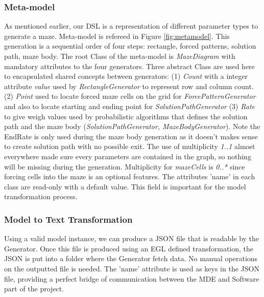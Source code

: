 \documentclass[review]{elsarticle}
\begin{document}
\subsubsection{Meta-model}
As mentioned earlier, our DSL is a representation of different parameter types to generate a maze. Meta-model is refereed in Figure \ref{fig:metamodel}. This generation is a sequential order of four steps: rectangle, forced patterns, solution path, maze body. The root Class of the meta-model is \textit{MazeDiagram} with mandatory attributes to the four generators. Three abstract Class are used here to encapsulated shared concepts between generators: (1) \textit{Count} with a integer attribute \textit{value} used by \textit{RectangleGenerator} to represent row and column count. (2) \textit{Point} used to locate forced maze cells on the grid for \textit{ForcePatternGenerator} and also to locate starting and ending point for \textit{SolutionPathGenerator} (3) \textit{Rate} to give weigh values used by probabilistic algorithms that defines the solution path and the maze body (\textit{SolutionPathGenerator, MazeBodyGenerator}). Note the EndRate is only used during the maze body generation as it doesn't makes sense to create solution path with no possible exit. The use of multiplicity \textit{1..1} almost everywhere made sure every parameters are contained in the graph, so nothing will be missing during the generation. Multiplicity for \textit{mazeCells} is \textit{0..*} since forcing cells into the maze is an optional features. The attributes 'name' in each class are read-only with a default value. This field is important for the model transformation process.

\subsubsection{Model to Text Transformation }
Using a valid model instance, we can produce a JSON file that is readable by the Generator. Once this file is produced using an EGL defined transformation, the JSON is put into a folder where the Generator fetch data. No manual operations on the outputted file is needed. The 'name' attribute is used as keys in the JSON file, providing a perfect bridge of communication between the MDE and Software part of the project.
\end{document}
